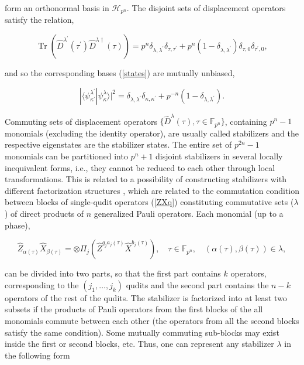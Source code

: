\documentclass[quantumrep,article,submit,pdftex,moreauthors]{Definitions/mdpi}
\DeclareMathOperator{\Tr}{Tr}
\begin{document}
form an orthonormal basis in $\mathcal{H}_{p^{n}}$. The disjoint sets of
displacement operators satisfy the relation,

\begin{equation*}
  \Tr\left(
    \hat{D}^{\lambda^{\prime}}(\tau^{\prime})\hat{D}^{\lambda\dagger}(\tau)
  \right)
  = p^{n} \delta_{\lambda,\lambda^{\prime}} \delta_{\tau,\tau^{\prime }}
  + p^{n}(1 - \delta_{\lambda,\lambda^{\prime}}) \delta_{\tau,0}
  \delta_{\tau^{\prime},0},
\end{equation*}

and so the corresponding bases (\ref{states}) are mutually unbiased,

\begin{equation}
  |\langle\psi_{\kappa^{\prime}}^{\lambda^{\prime}}
  |\psi_{\kappa}^{\lambda}\rangle|^{2}
  = \delta_{\lambda,\lambda^{\prime}} \delta_{\kappa,\kappa^{\prime}}
  + p^{-n} (1-\delta_{\lambda,\lambda^{\prime}}).
  \label{UB}
\end{equation}

Commuting sets of displacement operators $\{\hat{D}^{\lambda }(\tau ),\tau \in
\mathbb{F}_{p^{n}}\}$, containing $p^{n}-1$ monomials (excluding the identity
operator), are usually called stabilizers and the respective eigenstates are the
stabilizer states. The entire set of $p^{2n}-1$ monomials can be partitioned
into $p^{n}+1$ disjoint stabilizers in several locally inequivalent forms, i.e.,
they cannot be reduced to each other through local transformations. This is
related to a possibility of constructing stabilizers with different
factorization structures \cite{factor1,factor2}, which are related to the
commutation condition between blocks of single-qudit operators (\ref{ZXq})
constituting commutative sets ($\lambda$) of direct products of $n$
generalized Pauli operators. Each monomial (up to a phase),

\begin{equation*}
  \hat{Z}_{\alpha(\tau)}\hat{X}_{\beta(\tau)}
  = \otimes \Pi_{j} \left(
    \hat{Z}^{q_{j}a_{j}(\tau)}\hat{X}^{b_{j}(\tau)}
  \right),
  \quad \tau \in \mathbb{F}_{p^{n}},
  \quad \left(\alpha(\tau),\beta(\tau)\right) \in \lambda,
\end{equation*}

can be divided into two parts, so that the first part contains $k$ operators,
corresponding to the $(j_{1},\ldots ,j_{k})$ qudits and the second part contains
the $n-k$ operators of the rest of the qudits. The stabilizer is factorized into
at least two subsets if the products of Pauli operators from the first blocks of
the all monomials commute between each other (the operators from all the second
blocks satisfy the same condition).  Some mutually commuting sub-blocks may
exist inside the first or second blocks, etc. Thus, one can represent any
stabilizer $\lambda $ in the following form
\end{document}
